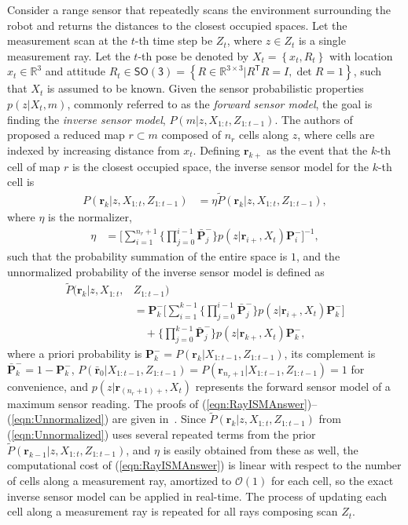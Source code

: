 \documentclass[smallextended]{svjour3}       %
\newcommand{\braces}[1]{\ensuremath{\left\{ #1 \right\}}}
\newcommand{\refeqn}[1]{(\ref{eqn:#1})}
\newcommand{\SO}{\ensuremath{\mathsf{SO(3)}}}
\newcommand{\T}{\ensuremath{\mathsf{T}}}
\renewcommand{\Re}{\ensuremath{\mathbb{R}}}
\begin{document}
Consider a range sensor that repeatedly scans the environment surrounding the robot and returns the distances to the closest occupied spaces. Let the measurement scan at the $t$-th time step be $Z_t$, where $z\in Z_t$ is a single measurement ray. Let the $t$-th pose be denoted by $X_t=\braces{x_t,R_t}$ with location $x_t\in\Re^3$ and attitude $R_t\in\SO=\braces{R\in\Re^{3\times3}|R^\T R=I,\det{R}=1}$, such that $X_t$ is assumed to be known. Given the sensor probabilistic properties $p(z|X_t,m)$, commonly referred to as the \emph{forward sensor model}, the goal is finding the \emph{inverse sensor model}, $P(m|z,X_{1:t},Z_{1:t-1})$. The authors of~\cite{KauLeeAiMos16,KauTakAiLee17} proposed a reduced map $r\subset m$ composed of $n_r$ cells along $z$, where cells are indexed by increasing distance from $x_t$. Defining $\mathbf{r}_{k+}$ as the event that the $k$-th cell of map $r$ is the closest occupied space, the inverse sensor model for the $k$-th cell is
\begin{align}
\label{eqn:RayISMAnswer}
P(\mathbf{r}_{k}|z,X_{1:t},Z_{1:t-1})&=\eta\tilde P(\mathbf{r}_{k}|z,X_{1:t},Z_{1:t-1}),
\end{align}
where $\eta$ is the normalizer,
\begin{align}
\label{eqn:allEta}
\eta
&=
\bigg[\sum_{i=1}^{n_{r}+1}\bigg\{\prod_{j=0}^{i-1}\bar{\mathbf{P}}_j^-\bigg\} p(z|\mathbf{r}_{i+},X_t)\mathbf{P}_i^-\bigg]^{-1},
\end{align}
such that the probability summation of the entire space is $1$, and the unnormalized probability of the inverse sensor model is defined as
\begin{align}
\label{eqn:Unnormalized}
\tilde P(\mathbf{r}_{k}|z,X_{1:t},&Z_{1:t-1})\nonumber\\
&=\mathbf{P}_k^-
\bigg[\sum_{i=1}^{k-1}\bigg\{\prod_{j=0}^{i-1}\bar{\mathbf{P}}_j^-\bigg\}p(z|\mathbf{r}_{i+},X_t)\mathbf{P}_k^-\bigg]\nonumber\\
&\quad + \bigg\{\prod_{j=0}^{k-1}\bar{\mathbf{P}}_j^-\bigg\}p(z|\mathbf{r}_{k+},X_t)\mathbf{P}_k^-,
\end{align}
where a priori probability is $\mathbf{P}_k^-=P(\mathbf{r}_{k}|X_{1:t-1},Z_{1:t-1})$, its complement is $\bar{\mathbf{P}}_k^-=1-\mathbf{P}_k^-$, $P(\bar{\mathbf{r}}_{0}|X_{1:t-1},Z_{1:t-1})=P(\mathbf{r}_{n_r+1}|X_{1:t-1},Z_{1:t-1})=1$ for convenience, and $p(z|\mathbf{r}_{(n_r+1)+},X_t)$ represents the forward sensor model of a maximum sensor reading. The proofs of \refeqn{RayISMAnswer}--\refeqn{Unnormalized} are given in~\cite{KauLeeAiMos16}. Since $\tilde P(\mathbf{r}_{k}|z,X_{1:t},Z_{1:t-1})$ from \refeqn{Unnormalized} uses several repeated terms from the prior $\tilde P(\mathbf{r}_{k-1}|z,X_{1:t},Z_{1:t-1})$, and $\eta$ is easily obtained from these as well, the computational cost of \refeqn{RayISMAnswer} is linear with respect to the number of cells along a measurement ray, amortized to $\mathcal{O}(1)$ for each cell, so the exact inverse sensor model can be applied in real-time. The process of updating each cell along a measurement ray is repeated for all rays composing scan $Z_t$.
\end{document}

